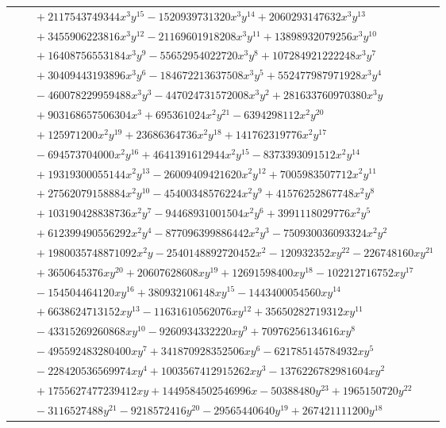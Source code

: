 \documentclass[11pt]{article}
\begin{document}
\begin{longtable}{@{}ll@{}}
 & $\quad +2117543749344x^{3}y^{15}-1520939731320x^{3}y^{14}+2060293147632x^{3}y^{13}$\\
 & $\quad +3455906223816x^{3}y^{12}-21169601918208x^{3}y^{11}+13898932079256x^{3}y^{10}$\\
 & $\quad +16408756553184x^{3}y^{9}-55652954022720x^{3}y^{8}+107284921222248x^{3}y^{7}$\\
 & $\quad +30409443193896x^{3}y^{6}-184672213637508x^{3}y^{5}+552477987971928x^{3}y^{4}$\\
 & $\quad -460078229959488x^{3}y^{3}-447024731572008x^{3}y^{2}+281633760970380x^{3}y$\\
 & $\quad +903168657506304x^{3}+695361024x^{2}y^{21}-6394298112x^{2}y^{20}$\\
 & $\quad +125971200x^{2}y^{19}+23686364736x^{2}y^{18}+141762319776x^{2}y^{17}$\\
 & $\quad -694573704000x^{2}y^{16}+4641391612944x^{2}y^{15}-8373393091512x^{2}y^{14}$\\
 & $\quad +19319300055144x^{2}y^{13}-26009409421620x^{2}y^{12}+7005983507712x^{2}y^{11}$\\
 & $\quad +27562079158884x^{2}y^{10}-45400348576224x^{2}y^{9}+41576252867748x^{2}y^{8}$\\
 & $\quad +103190428838736x^{2}y^{7}-94468931001504x^{2}y^{6}+3991118029776x^{2}y^{5}$\\
 & $\quad +612399490556292x^{2}y^{4}-877096399886442x^{2}y^{3}-750930036093324x^{2}y^{2}$\\
 & $\quad +1980035748871092x^{2}y-2540148892720452x^{2}-120932352xy^{22}-226748160xy^{21}$\\
 & $\quad +3650645376xy^{20}+20607628608xy^{19}+12691598400xy^{18}-102212716752xy^{17}$\\
 & $\quad -154504464120xy^{16}+380932106148xy^{15}-1443400054560xy^{14}$\\
 & $\quad +6638624713152xy^{13}-11631610562076xy^{12}+35650282719312xy^{11}$\\
 & $\quad -43315269260868xy^{10}-9260934332220xy^{9}+70976256134616xy^{8}$\\
 & $\quad -495592483280400xy^{7}+341870928352506xy^{6}-621785145784932xy^{5}$\\
 & $\quad -228420536569974xy^{4}+1003567412915262xy^{3}-1376226782981604xy^{2}$\\
 & $\quad +1755627477239412xy+1449584502546996x-50388480y^{23}+1965150720y^{22}$\\
 & $\quad -3116527488y^{21}-9218572416y^{20}-29565440640y^{19}+267421111200y^{18}$\\

\end{longtable}
\end{document}
